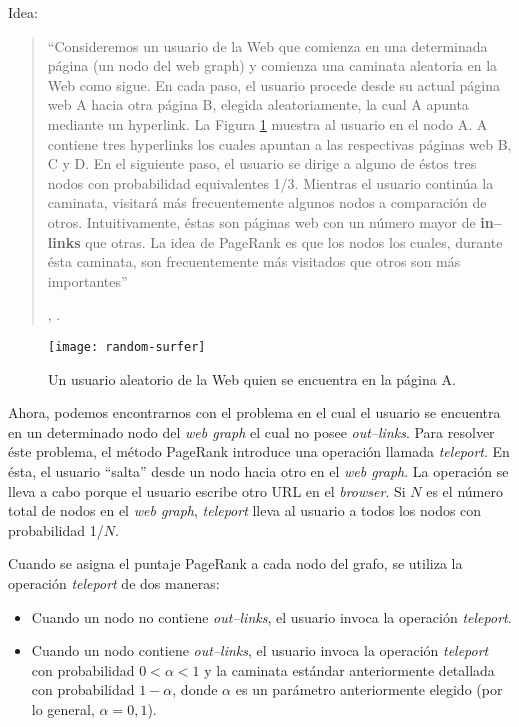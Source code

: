 		Idea:
		\begin{quote}
			\begin{itshape}
				\enquote{Consideremos un usuario de la Web que comienza en una determinada página (un nodo del web graph) y comienza una caminata aleatoria en la Web como sigue. En cada paso, el usuario procede desde su actual página web A hacia otra página B, elegida aleatoriamente, la cual A apunta mediante un hyperlink. La Figura \ref{fig:random-surfer} muestra al usuario en el nodo A. A contiene tres hyperlinks los cuales apuntan a las respectivas páginas web B, C y D. En el siguiente paso, el usuario se dirige a alguno de éstos tres nodos con probabilidad equivalentes 1/3. Mientras el usuario continúa la caminata, visitará más frecuentemente algunos nodos a comparación de otros. Intuitivamente, éstas son páginas web con un número mayor de \textbf{in--links} que otras. La idea de PageRank es que los nodos los cuales, durante ésta caminata, son frecuentemente más visitados que otros son más importantes}
			\end{itshape}, \cite{manning2009}.
		\end{quote}
		
		\begin{figure}[]
			\centering
			\texttt{[image: random-surfer]}
			\caption{Un usuario aleatorio de la Web quien se encuentra en la página A.}
			\label{fig:random-surfer}
		\end{figure}
		
		
		Ahora, podemos encontrarnos con el problema en el cual el usuario se encuentra en un determinado nodo del \textit{web graph} el cual no posee \textit{out--links}. Para resolver éste problema, el método PageRank introduce una operación llamada \textit{teleport}. En ésta, el usuario \enquote{salta} desde un nodo hacia otro en el \textit{web graph}. La operación se lleva a cabo porque el usuario escribe otro URL en el \textit{browser}. Si $N$ es el número total de nodos en el \textit{web graph}, \textit{teleport} lleva al usuario a todos los nodos con probabilidad 1/$N$. \par
		
		Cuando se asigna el puntaje PageRank a cada nodo del grafo, se utiliza la operación \textit{teleport} de dos maneras:
		\begin{itemize}
			\item Cuando un nodo no contiene \textit{out--links}, el usuario invoca la operación \textit{teleport}.
			\item Cuando un nodo contiene \textit{out--links}, el usuario invoca la operación \textit{teleport} con probabilidad $0 < \alpha < 1$ y la caminata estándar anteriormente detallada con probabilidad $1 - \alpha$, donde $\alpha$ es un parámetro anteriormente elegido (por lo general, $\alpha = 0,1$).
		\end{itemize}
		
